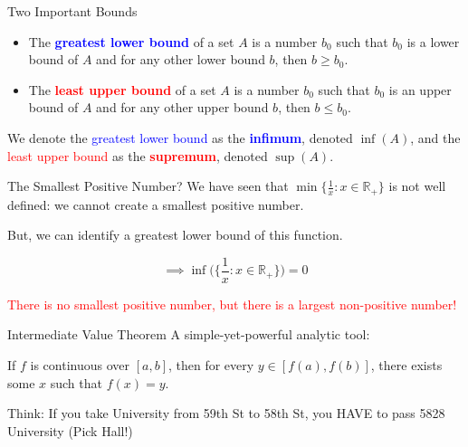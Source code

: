 \documentclass[10pt]{beamer}
\begin{document}
\begin{frame}{Two Important Bounds}
    \begin{itemize}
        \item The \textbf{\textcolor{blue}{greatest lower bound}} of a set $A$ is a number $b_0$ such that $b_0$ is a lower bound of $A$ and for any other lower bound $b$, then $b \geq b_0$.
        \item The \textbf{\textcolor{red}{least upper bound}} of a set $A$ is a number $b_0$ such that $b_0$ is an upper bound of $A$ and for any other upper bound $b$, then $b \leq b_0$.
    \end{itemize}

We denote the \textcolor{blue}{greatest lower bound} as the \textbf{\textcolor{blue}{infimum}}, denoted $\inf(A)$, and the \textcolor{red}{least upper bound} as the \textbf{\textcolor{red}{supremum}}, denoted $\sup(A)$.
\end{frame}

\begin{frame}{The Smallest Positive Number?}
    We have seen that $\min \{\frac{1}{x} : x \in \mathbb{R}_+\}$ is not well defined: we cannot create a smallest positive number. \\

    \vspace{.5cm}

    But, we can identify a greatest lower bound of this function.

    \[\implies \inf \Big(\Big\{\frac{1}{x} : x \in \mathbb{R}_+\Big\}\Big) = 0\]

    \textcolor{red}{There is no smallest positive number, but there is a largest non-positive number!}
\end{frame}




\begin{frame}{Intermediate Value Theorem}
    A simple-yet-powerful analytic tool: \\

    \vspace{.5cm}

    If $f$ is continuous over $[a,b]$, then for every $y \in [f(a),f(b)]$, there exists some $x$ such that $f(x) = y$. \\

    \vspace{.5cm}

    Think: If you take University from 59th St to 58th St, you HAVE to pass 5828 University (Pick Hall!)
\end{frame}
\end{document}
